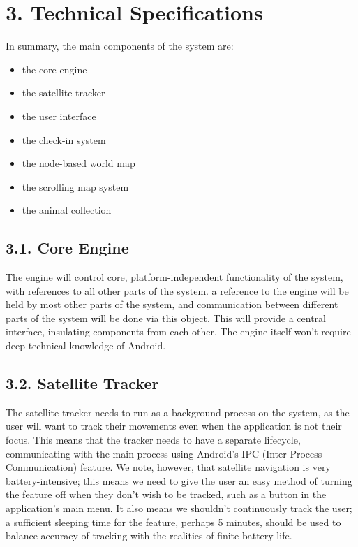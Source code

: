 \documentclass[]{report}
\begin{document}
\section*{3. Technical Specifications}

In summary, the main components of the system are:
\begin{itemize}
\item the core engine
\item the satellite tracker
\item the user interface
\item the check-in system
\item the node-based world map
\item the scrolling map system
\item the animal collection
\end{itemize}

\subsection*{3.1. Core Engine}

The engine will control core, platform-independent functionality of the system, with references to all other parts of the system. a reference to the engine will be held by most other parts of the system, and communication between different parts of the system will be done via this object. This will provide a central interface, insulating components from each other. The engine itself won't require deep technical knowledge of Android.

\subsection*{3.2. Satellite Tracker}

The satellite tracker needs to run as a background process on the system, as the user will want to track their movements even when the application is not their focus. This means that the tracker needs to have a separate lifecycle, communicating with the main process using Android's IPC (Inter-Process Communication) feature. We note, however, that satellite navigation is very battery-intensive; this means we need to give the user an easy method of turning the feature off when they don't wish to be tracked, such as a button in the application's main menu. It also means we shouldn't continuously track the user; a sufficient sleeping time for the feature, perhaps 5 minutes, should be used to balance accuracy of tracking with the realities of finite battery life. 
\end{document}
